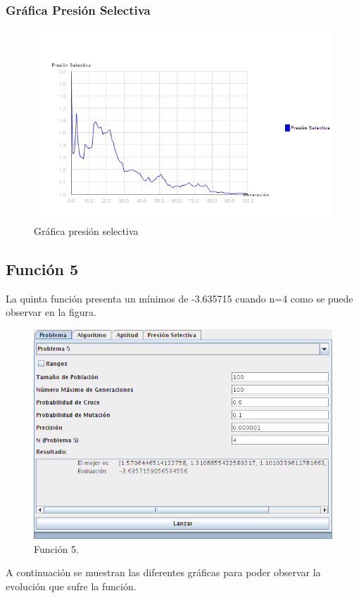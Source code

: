 \documentclass[12pt]{article}
\begin{document}
\subsubsection*{Gráfica Presión Selectiva}
\begin{figure}[H]
\centering
\includegraphics[scale=0.5]{graficas/F4inicial_presion}
\caption{Gráfica presión selectiva}
\label{fig}
\end{figure}
\newpage

\subsection{Función 5}
	La quinta función presenta un mínimos de -3.635715 cuando n=4 como se puede observar en la figura.
\begin{figure}[H]
\centering
\includegraphics[scale=0.5]{graficas/F5inicial}
\caption{Función 5.}
\label{fig}
\end{figure}
	A continuación se muestran las diferentes gráficas para poder observar la evolución que sufre la función.
\end{document}
